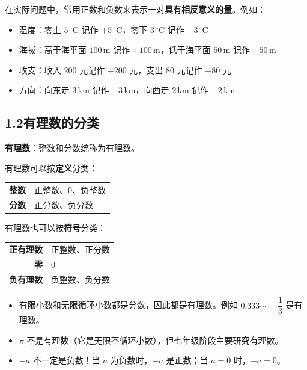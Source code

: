\documentclass[12pt, a4paper]{ctexart}
\begin{document}
\begin{knowledgebox}[用正负数表示相反意义的量]
在实际问题中，常用正数和负数来表示一对\textbf{具有相反意义的量}。例如：
\begin{itemize}[leftmargin=*]
  \item 温度：零上 $5\,^\circ\mathrm{C}$ 记作 $+5\,^\circ\mathrm{C}$，零下 $3\,^\circ\mathrm{C}$ 记作 $-3\,^\circ\mathrm{C}$
  \item 海拔：高于海平面 $100\,\mathrm{m}$ 记作 $+100\,\mathrm{m}$，低于海平面 $50\,\mathrm{m}$ 记作 $-50\,\mathrm{m}$
  \item 收支：收入 $200$ 元记作 $+200$ 元，支出 $80$ 元记作 $-80$ 元
  \item 方向：向东走 $3\,\mathrm{km}$ 记作 $+3\,\mathrm{km}$，向西走 $2\,\mathrm{km}$ 记作 $-2\,\mathrm{km}$
\end{itemize}
\end{knowledgebox}

\subsection*{1.2\quad 有理数的分类}

\begin{knowledgebox}[有理数的定义与分类]
\textbf{有理数}：整数和分数统称为有理数。

有理数可以按\textbf{定义}分类：
\begin{center}
\begin{tabular}{r|l}
\textbf{整数} & 正整数、$0$、负整数\\
\textbf{分数} & 正分数、负分数
\end{tabular}
\end{center}

有理数也可以按\textbf{符号}分类：
\begin{center}
\begin{tabular}{r|l}
\textbf{正有理数} & 正整数、正分数\\
\textbf{零} & $0$\\
\textbf{负有理数} & 负整数、负分数
\end{tabular}
\end{center}
\end{knowledgebox}

\begin{warnbox}[易错提醒]
\begin{itemize}[leftmargin=*]
  \item 有限小数和无限循环小数都是分数，因此都是有理数。例如 $0.333\cdots = \dfrac{1}{3}$ 是有理数。
  \item $\pi$ 不是有理数（它是无限不循环小数），但七年级阶段主要研究有理数。
  \item $-a$ 不一定是负数！当 $a$ 为负数时，$-a$ 是正数；当 $a = 0$ 时，$-a = 0$。
\end{itemize}
\end{warnbox}
\end{document}
